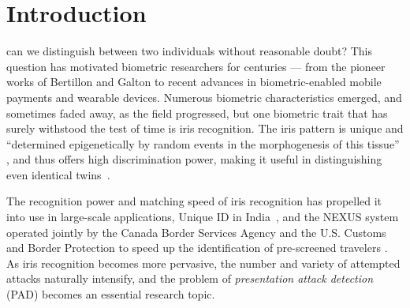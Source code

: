 \section{Introduction}

 can we distinguish between two individuals without reasonable doubt? This question has motivated biometric researchers for centuries --- from the pioneer works of Bertillon and Galton
to recent advances in biometric-enabled mobile payments and wearable devices.
Numerous biometric characteristics emerged, and sometimes faded away, as the field progressed, but one biometric trait that has surely withstood the test of time is iris recognition. The iris pattern is unique and ``determined epigenetically by random events in the morphogenesis of this tissue'' \cite{Daugman_PRS_2001}, and thus offers high discrimination power, making it useful in distinguishing even identical twins~\cite{Bowyer_BTAS_2016}.

The recognition power and matching speed of iris recognition has propelled it into use in large-scale applications, \eg Unique ID in India~\cite{UIDAI,Daugman:SPIE:2014}, and the NEXUS system operated jointly by the Canada Border Services Agency and the U.S. Customs and Border Protection to speed up the identification of pre-screened travelers \cite{NEXUS_URL}. As iris recognition becomes more pervasive, the number and variety of attempted attacks naturally intensify, and the problem of \emph{presentation attack detection} (PAD) becomes an essential research topic.

